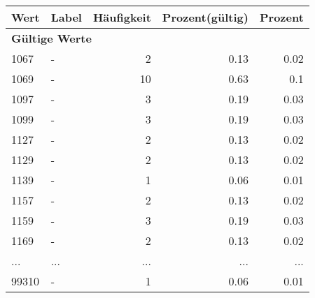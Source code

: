      \begin{longtable}{lXrrr}
     \toprule
     \textbf{Wert} & \textbf{Label} & \textbf{Häufigkeit} & \textbf{Prozent(gültig)} & \textbf{Prozent} \\
     \endhead
     \midrule
     \multicolumn{5}{l}{\textbf{Gültige Werte}}\\
        1067 & \multicolumn{1}{X}{-} & %
          \num{2} &
          \num[round-mode=places,round-precision=2]{0,13} &
          \num[round-mode=places,round-precision=2]{0,02} \\
        1069 & \multicolumn{1}{X}{-} & %
          \num{10} &
          \num[round-mode=places,round-precision=2]{0,63} &
          \num[round-mode=places,round-precision=2]{0,1} \\
        1097 & \multicolumn{1}{X}{-} & %
          \num{3} &
          \num[round-mode=places,round-precision=2]{0,19} &
          \num[round-mode=places,round-precision=2]{0,03} \\
        1099 & \multicolumn{1}{X}{-} & %
          \num{3} &
          \num[round-mode=places,round-precision=2]{0,19} &
          \num[round-mode=places,round-precision=2]{0,03} \\
        1127 & \multicolumn{1}{X}{-} & %
          \num{2} &
          \num[round-mode=places,round-precision=2]{0,13} &
          \num[round-mode=places,round-precision=2]{0,02} \\
        1129 & \multicolumn{1}{X}{-} & %
          \num{2} &
          \num[round-mode=places,round-precision=2]{0,13} &
          \num[round-mode=places,round-precision=2]{0,02} \\
        1139 & \multicolumn{1}{X}{-} & %
          \num{1} &
          \num[round-mode=places,round-precision=2]{0,06} &
          \num[round-mode=places,round-precision=2]{0,01} \\
        1157 & \multicolumn{1}{X}{-} & %
          \num{2} &
          \num[round-mode=places,round-precision=2]{0,13} &
          \num[round-mode=places,round-precision=2]{0,02} \\
        1159 & \multicolumn{1}{X}{-} & %
          \num{3} &
          \num[round-mode=places,round-precision=2]{0,19} &
          \num[round-mode=places,round-precision=2]{0,03} \\
        1169 & \multicolumn{1}{X}{-} & %
          \num{2} &
          \num[round-mode=places,round-precision=2]{0,13} &
          \num[round-mode=places,round-precision=2]{0,02} \\
       ... & ... & ... & ... & ... \\
        99310 & \multicolumn{1}{X}{-} & %
          \num{1} &
          \num[round-mode=places,round-precision=2]{0,06} &
          \num[round-mode=places,round-precision=2]{0,01} \\


\end{longtable}
